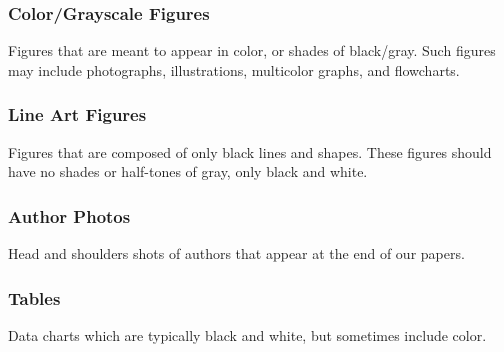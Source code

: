 \documentclass{IEEEoj}
\begin{document}
\subsubsection{Color/Grayscale Figures}
Figures that are meant to appear in color, or shades of black/gray. Such 
figures may include photographs, illustrations, multicolor graphs, and 
flowcharts.

\subsubsection{Line Art Figures}
Figures that are composed of only black lines and shapes. These figures 
should have no shades or half-tones of gray, only black and white.

\subsubsection{Author Photos}
Head and shoulders shots of authors that appear at the end of our papers. 

\subsubsection{Tables}
Data charts which are typically black and white, but sometimes include 
color.
\end{document}
